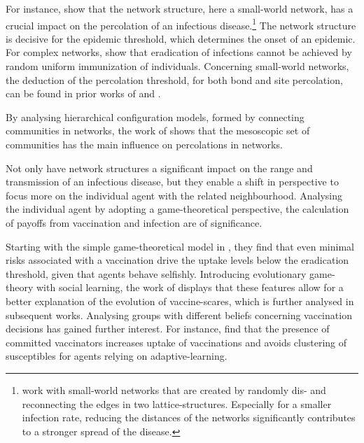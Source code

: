 \documentclass[11pt]{article}
\begin{document}
For instance, \cite{liu2015} show that the network structure, here a small-world network, has a crucial impact on the percolation of an infectious disease.\footnote{\cite{liu2015} work with small-world networks that are created by randomly dis- and reconnecting the edges in two lattice-structures. Especially for a smaller infection rate, reducing the distances of the networks significantly contributes to a stronger spread of the disease.} 
The network structure is decisive for the epidemic threshold, which determines the onset of an epidemic. For complex networks, \cite{pastor2002} show that eradication of infections cannot be achieved by random uniform immunization of individuals. Concerning small-world networks, the deduction of the percolation threshold, for both bond and site percolation, can be found in prior works of \cite{newman1999} and \cite{moore2000}. 

By analysing hierarchical configuration models, formed by connecting communities in networks, the work of \cite{stegehuis2016} shows that the mesoscopic set of communities has the main influence on percolations in networks.

Not only have network structures a significant impact on the range and transmission of an infectious disease, but they enable a shift in perspective to focus more on the individual agent with the related neighbourhood. 
Analysing the individual agent by adopting a game-theoretical perspective, the calculation of payoffs from vaccination and infection are of significance. 

Starting with the simple game-theoretical model in \cite{bauch2004}, they find that even minimal risks associated with a vaccination drive the uptake levels below the eradication threshold, given that agents behave selfishly. 
Introducing evolutionary game-theory with social learning, the work of \cite{bauch2012} displays that these features allow for a better explanation of the evolution of vaccine-scares, which is further analysed in subsequent works.
Analysing groups with different beliefs concerning vaccination decisions has gained further interest. For instance, \cite{liu2012} find that the presence of committed vaccinators increases uptake of vaccinations and avoids clustering of susceptibles for agents relying on adaptive-learning.  
\end{document}
